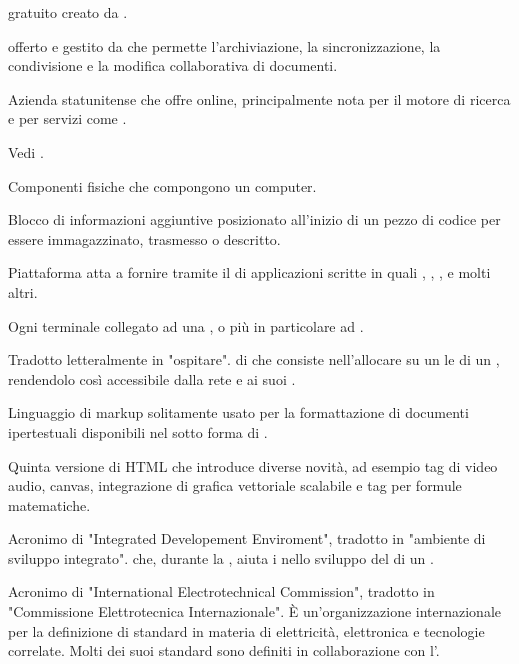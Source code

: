 { gratuito creato da .}

{ offerto e gestito da  che permette l'archiviazione, la sincronizzazione, la condivisione e la modifica collaborativa di documenti.}

{Azienda statunitense che offre  online, principalmente nota per il motore di ricerca  e per servizi come .}

{Vedi .}




{Componenti fisiche che compongono un computer.}

{Blocco di informazioni aggiuntive posizionato all'inizio di un pezzo di codice per essere immagazzinato, trasmesso o descritto.}

{Piattaforma  atta a fornire  tramite il  di applicazioni scritte in  quali , , , e molti altri.}

{Ogni terminale collegato ad una , o più in particolare ad .}

{Tradotto letteralmente in "ospitare".  di  che consiste nell'allocare su un  le  di un , rendendolo così accessibile dalla rete  e ai suoi .}

{Linguaggio di markup solitamente usato per la formattazione di documenti ipertestuali disponibili nel  sotto forma di .}

{Quinta versione di HTML che introduce diverse novità, ad esempio tag di video audio, canvas, integrazione di grafica vettoriale scalabile e tag per formule matematiche.}




{Acronimo di "Integrated Developement Enviroment", tradotto in "ambiente di sviluppo integrato".  che, durante la , aiuta i  nello sviluppo del  di un .}

{Acronimo di "International Electrotechnical Commission", tradotto in "Commissione Elettrotecnica Internazionale". \`{E} un'organizzazione internazionale per la definizione di standard in materia di elettricità, elettronica e tecnologie correlate. Molti dei suoi standard sono definiti in collaborazione con l'.}

